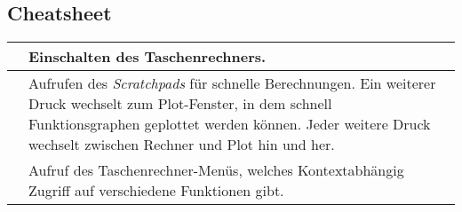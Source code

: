 \documentclass[11pt, a4paper]{scrartcl}
\begin{document}
\subsection{Cheatsheet}
\begin{tabular}{|c|p{8cm}|} \hline
	\TINon* & Einschalten des Taschenrechners. \\ \hline
	\TINscratch* & Aufrufen des \emph{Scratchpads} für schnelle Berechnungen. Ein weiterer Druck wechselt zum Plot-Fenster, in dem schnell Funktionsgraphen geplottet werden können. Jeder weitere Druck wechselt zwischen Rechner und Plot hin und her. \\ \hline
	\TINmenu* & Aufruf des Taschenrechner-Menüs, welches Kontextabhängig Zugriff auf verschiedene Funktionen gibt. \\ \hline
\end{tabular}
\end{document}
